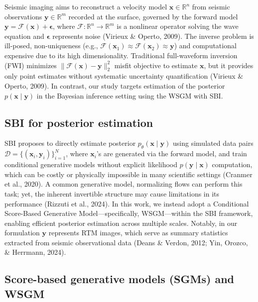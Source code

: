 \documentclass{IMAGE2025}
\begin{document}
Seismic imaging aims to reconstruct a velocity model
\(\mathbf{x} \in \mathbb{R}^n\) from seismic observations
\(\mathbf{y} \in \mathbb{R}^m\) recorded at the surface, governed by the
forward model
\(\mathbf{y} = \mathbf{\mathcal{F}}(\mathbf{x}) + \boldsymbol{\epsilon}\),
where \(\mathbf{\mathcal{F}}: \mathbb{R}^n \rightarrow \mathbb{R}^m\) is
a nonlinear operator solving the wave equation and
\(\boldsymbol{\epsilon}\) represents noise (Virieux \& Operto, 2009).
The inverse problem is ill-posed, non-uniqueness (e.g.,
\(\mathbf{\mathcal{F}}(\mathbf{x}_1) \approx \mathbf{\mathcal{F}}(\mathbf{x}_2) \approx \mathbf{y}\))
and computational expensive due to its high dimensionality. Traditional
full-waveform inversion (FWI) minimizes
\(\|\mathbf{\mathcal{F}}(\mathbf{x}) - \mathbf{y}\|_2^2\) misfit
objective to estimate \(\mathbf{x}\), but it provides only point
estimates without systematic uncertainty quantification (Virieux \&
Operto, 2009). In contrast, our study targets estimation of the
posterior \(p(\mathbf{x} \mid \mathbf{y})\) in the Bayesian inference
setting using the WSGM with SBI.

\subsection{SBI for posterior
estimation}\label{sbi-for-posterior-estimation}

SBI proposes to directly estimate posterior
\(p_{\theta}(\mathbf{x} \mid \mathbf{y})\) using simulated data pairs
\(\mathcal{D} = \{ (\mathbf{x}_i, \mathbf{y}_i) \}_{i=1}^{N}\), where
\(\mathbf{x}_i\)'s are generated via the forward model, and train
conditional generative models without explicit likelihood
\(p(\mathbf{y} \mid \mathbf{x})\) computation, which can be costly or
physically impossible in many scientific settings (Cranmer et al.,
2020). A common generative model, normalizing flows can perform this
task; yet, the inherent invertible structure may cause limitations in
its performance (Rizzuti et al., 2024). In this work, we instead adopt a
Conditional Score-Based Generative Model---specifically, WSGM---within
the SBI framework, enabling efficient posterior estimation across
multiple scales. Notably, in our formulation \(\mathbf{y}\) represents
RTM images, which serve as summary statistics extracted from seismic
observational data (Deans \& Verdon, 2012; Yin, Orozco, \& Herrmann,
2024).

\subsection{Score-based generative models (SGMs) and
WSGM}\label{score-based-generative-models-sgms-and-wsgm}
\end{document}
